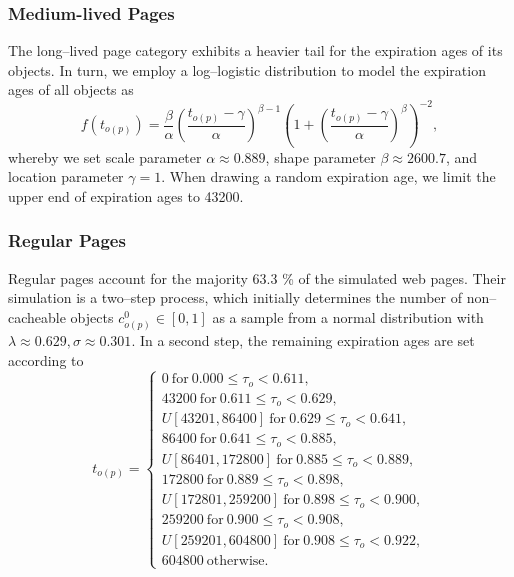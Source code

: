\subsubsection{Medium-lived Pages}
The long--lived page category exhibits a heavier tail for the expiration ages of its objects.
In turn, we employ a log--logistic distribution to model the expiration ages of all objects as 
\begin{equation}
f(t_{o(p)})=\frac{\beta}{\alpha} \left(\frac{t_{o(p)}-\gamma}{\alpha}\right)^{\beta-1}\left(1+\left(\frac{t_{o(p)}-\gamma}{\alpha}\right)^\beta\right)^{-2},
\end{equation}
whereby we set scale parameter $\alpha \approx 0.889 $, shape parameter $\beta \approx 2600.7$, and location parameter $\gamma=1$. 
When drawing a random expiration age, we limit the upper end of expiration ages to 43200.

\subsubsection{Regular Pages}
Regular pages account for the majority 63.3 \% of the simulated web pages. 
Their simulation is a two--step process, which initially determines the number of non--cacheable objects $c^0_{o(p)} \in [0,1]$ as a sample from a normal distribution with $\lambda \approx 0.629, \sigma \approx 0.301$.
In a second step, the remaining expiration ages are set according to 
\begin{equation*}
t_{o(p)} =
\begin{cases}
	0	~\mathrm{for}~	0.000	\le \tau_o <	0.611,                \\
	43200	~\mathrm{for}~	0.611	\le \tau_o <	0.629,            \\
	U[43201,86400]	~\mathrm{for}~	0.629	\le \tau_o <	0.641,   \\
	86400	~\mathrm{for}~	0.641	\le \tau_o <	0.885,            \\
	U[86401,172800]	~\mathrm{for}~	0.885	\le \tau_o <	0.889,  \\
	172800	~\mathrm{for}~	0.889	\le \tau_o <	0.898,           \\
	U[172801,259200]	~\mathrm{for}~	0.898	\le\tau_o <	0.900, \\
	259200	~\mathrm{for}~	0.900	\le \tau_o <	0.908,          \\
	U[259201,604800]	~\mathrm{for}~	0.908	\le \tau_o <	0.922, \\
	604800	~\mathrm{otherwise}.
\end{cases}
\end{equation*}

